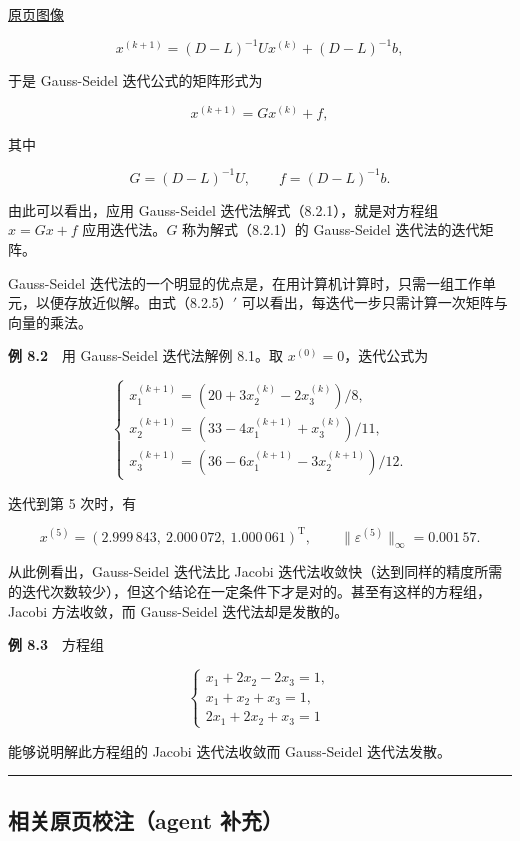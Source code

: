 \documentclass[
  10pt,
  fontset=fandol]{ctexart}
\begin{document}
\href{../../source-images/pdf-219.jpeg}{原页图像}

\[
x^{(k+1)}=(D-L)^{-1}Ux^{(k)}+(D-L)^{-1}b,
\]

于是 Gauss-Seidel 迭代公式的矩阵形式为

\[
x^{(k+1)}=Gx^{(k)}+f,
\tag{8.2.6}
\]

其中

\[
G=(D-L)^{-1}U,\qquad f=(D-L)^{-1}b.
\]

由此可以看出，应用 Gauss-Seidel 迭代法解式（8.2.1），就是对方程组 \(x=Gx+f\) 应用迭代法。\(G\) 称为解式（8.2.1）的 Gauss-Seidel 迭代法的迭代矩阵。

Gauss-Seidel 迭代法的一个明显的优点是，在用计算机计算时，只需一组工作单元，以便存放近似解。由式（8.2.5）\('\) 可以看出，每迭代一步只需计算一次矩阵与向量的乘法。

\textbf{例 8.2}　用 Gauss-Seidel 迭代法解例 8.1。取 \(x^{(0)}=0\)，迭代公式为

\[
\begin{cases}
x_1^{(k+1)}=(20+3x_2^{(k)}-2x_3^{(k)})/8,\\
x_2^{(k+1)}=(33-4x_1^{(k+1)}+x_3^{(k)})/11,\\
x_3^{(k+1)}=(36-6x_1^{(k+1)}-3x_2^{(k+1)})/12.
\end{cases}
\]

迭代到第 5 次时，有

\[
x^{(5)}=(2.999\,843,\ 2.000\,072,\ 1.000\,061)^{\mathrm T},\qquad
\|\varepsilon^{(5)}\|_\infty=0.001\,57.
\]

从此例看出，Gauss-Seidel 迭代法比 Jacobi 迭代法收敛快（达到同样的精度所需的迭代次数较少），但这个结论在一定条件下才是对的。甚至有这样的方程组，Jacobi 方法收敛，而 Gauss-Seidel 迭代法却是发散的。

\textbf{例 8.3}　方程组

\[
\begin{cases}
x_1+2x_2-2x_3=1,\\
x_1+x_2+x_3=1,\\
2x_1+2x_2+x_3=1
\end{cases}
\]

能够说明解此方程组的 Jacobi 迭代法收敛而 Gauss-Seidel 迭代法发散。

\begin{center}\rule{0.5\linewidth}{0.5pt}\end{center}

\subsection{相关原页校注（agent 补充）}\label{ux76f8ux5173ux539fux9875ux6821ux6ce8agent-ux8865ux5145}
\end{document}
